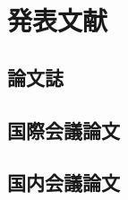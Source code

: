 \documentclass[fleqn]{jreport}
\begin{document}
    \chapter*{発表文献}

        \section*{論文誌}

        \section*{国際会議論文}

        \section*{国内会議論文}
\end{document}
